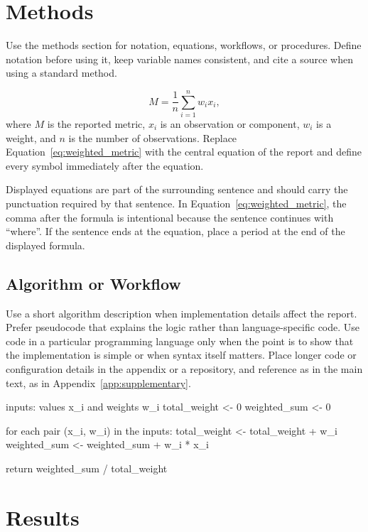 \documentclass[a4paper,11pt]{report}
\begin{document}
\section{Methods}

Use the methods section for notation, equations, workflows, or procedures. Define notation before using it, keep variable names consistent, and cite a source when using a standard method.

\begin{equation}
  M = \frac{1}{n}\sum_{i=1}^{n} w_i x_i,
  \label{eq:weighted_metric}
\end{equation}
where \(M\) is the reported metric, \(x_i\) is an observation or component, \(w_i\) is a weight, and \(n\) is the number of observations. Replace Equation~\ref{eq:weighted_metric} with the central equation of the report and define every symbol immediately after the equation.

Displayed equations are part of the surrounding sentence and should carry the punctuation required by that sentence. In Equation~\ref{eq:weighted_metric}, the comma after the formula is intentional because the sentence continues with ``where''. If the sentence ends at the equation, place a period at the end of the displayed formula.

\subsection{Algorithm or Workflow}

Use a short algorithm description when implementation details affect the report. Prefer pseudocode that explains the logic rather than language-specific code. Use code in a particular programming language only when the point is to show that the implementation is simple or when syntax itself matters. Place longer code or configuration details in the appendix or a repository, and reference as in the main text, as in Appendix~\ref{app:supplementary}.

\begin{pseudocodebox}
inputs: values x_i and weights w_i
total_weight <- 0
weighted_sum <- 0

for each pair (x_i, w_i) in the inputs:
    total_weight <- total_weight + w_i
    weighted_sum <- weighted_sum + w_i * x_i

return weighted_sum / total_weight
\end{pseudocodebox}

\section{Results}
\end{document}
